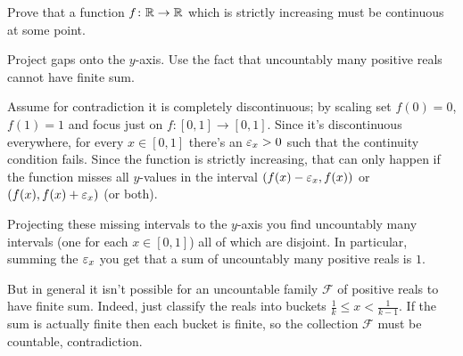\begin{problem}
	\yod
	Prove that a function $f \colon \mathbb R \to \mathbb R$ which is strictly increasing
	must be continuous at some point.
	\begin{hint}
		Project gaps onto the $y$-axis.
		Use the fact that uncountably many positive reals cannot have finite sum.
	\end{hint}
	\begin{sol}
		Assume for contradiction it is completely discontinuous;
		by scaling set $f(0) = 0$, $f(1) = 1$ and focus just on $f \colon [0,1] \to [0,1]$.
		Since it's discontinuous everywhere,
		for every $x \in [0,1]$ there's an $\varepsilon_x > 0$
		such that the continuity condition fails.
		Since the function is strictly increasing,
		that can only happen if the
		function misses all $y$-values in the interval
		$(f(x)-\varepsilon_x, f(x))$ or $(f(x), f(x)+\varepsilon_x)$ (or both).

		Projecting these missing intervals to the $y$-axis you find uncountably
		many intervals (one for each $x \in [0,1]$) all of which are disjoint.
		In particular, summing the $\varepsilon_x$ you get that a sum of uncountably
		many positive reals is $1$.

		But in general it isn't possible for an uncountable family $\mathcal F$
		of positive reals to have finite sum.
		Indeed, just classify the reals into buckets $\frac1k \le x < \frac1{k-1}$.
		If the sum is actually finite then each bucket is finite,
		so the collection $\mathcal F$ must be countable, contradiction.
	\end{sol}
\end{problem}

